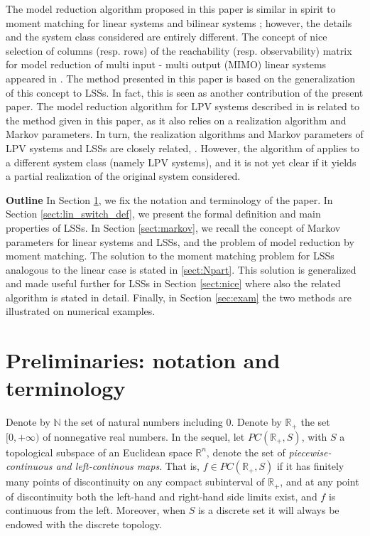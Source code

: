 \documentclass[journal]{IEEEtran}
\begin{document}
The model reduction algorithm proposed in this paper is similar in spirit to moment matching for linear systems \cite{antoulas,gugercin} and bilinear systems \cite{BilinearMomentMatching2,BilinearMomentMatching3,BilinearMomentMatching5}; however, the details and the system class considered are entirely different. The concept of nice selection of columns (resp. rows) of the reachability (resp. observability) matrix for model reduction of multi input - multi output (MIMO) linear systems appeared in \cite{gugercin}. The method presented in this paper is based on the generalization of this concept to LSSs. In fact, this is seen as another contribution of the present paper. The model reduction algorithm for LPV systems described in \cite{toth2012} is related to the method given in this paper, as it also relies on a realization algorithm and Markov parameters. In turn, the realization algorithms and Markov parameters of LPV systems and LSSs are closely related, \cite{PM12}. However, the algorithm of \cite{toth2012} applies to a different system class (namely LPV systems), and it is not yet clear if it yields a partial realization of the original system considered.

\textbf{Outline}
In Section \ref{sect:prelim}, we fix the notation and terminology of the paper. In Section \ref{sect:lin_switch_def}, we present the formal definition and main properties of LSSs. In Section \ref{sect:markov}, we recall the concept of Markov parameters for linear systems and LSSs, and the problem of model reduction by moment matching. The solution to the moment matching problem for LSSs analogous to the linear case is stated in \ref{sect:Npart}. This solution is generalized and made useful further for LSSs in Section \ref{sect:nice} where also the related algorithm is stated in detail. Finally, in Section \ref{sec:exam} the two methods are illustrated on numerical examples.






\section{Preliminaries: notation and terminology}
\label{sect:prelim}

Denote by $\mathbb{N}$ the set of natural numbers including $0$. Denote by $\mathbb{R}_+$ the set $[0,+\infty)$ of nonnegative real numbers. In the sequel, let $PC(\mathbb{R}_+,S)$, with $S$ a topological subspace of an Euclidean space $\mathbb{R}^{n}$, denote the set of \emph{piecewise-continuous and left-continous maps}. That is, $f\in PC(\mathbb{R}_+,S)$ if it has finitely many points of discontinuity on any compact subinterval of $\mathbb{R}_+$, and at any point of discontinuity both the left-hand and right-hand side limits exist, and $f$ is continuous from the left. Moreover, when $S$ is a discrete set it will always be endowed with the discrete topology.
\end{document}
